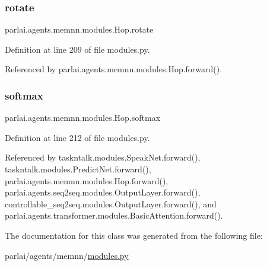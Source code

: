 \subsubsection{\texorpdfstring{rotate}{rotate}}
{\footnotesize\ttfamily parlai.\+agents.\+memnn.\+modules.\+Hop.\+rotate}



Definition at line 209 of file modules.\+py.



Referenced by parlai.\+agents.\+memnn.\+modules.\+Hop.\+forward().

\mbox{\label{classparlai_1_1agents_1_1memnn_1_1modules_1_1Hop_a50d4a5a4bd188efc2944d68c0761cc0a}} 
\subsubsection{\texorpdfstring{softmax}{softmax}}
{\footnotesize\ttfamily parlai.\+agents.\+memnn.\+modules.\+Hop.\+softmax}



Definition at line 212 of file modules.\+py.



Referenced by taskntalk.\+modules.\+Speak\+Net.\+forward(), taskntalk.\+modules.\+Predict\+Net.\+forward(), parlai.\+agents.\+memnn.\+modules.\+Hop.\+forward(), parlai.\+agents.\+seq2seq.\+modules.\+Output\+Layer.\+forward(), controllable\+\_\+seq2seq.\+modules.\+Output\+Layer.\+forward(), and parlai.\+agents.\+transformer.\+modules.\+Basic\+Attention.\+forward().



The documentation for this class was generated from the following file\+:\begin{DoxyCompactItemize}
\item 
parlai/agents/memnn/\hyperlink{parlai_2agents_2memnn_2modules_8py}{modules.\+py}\end{DoxyCompactItemize}

